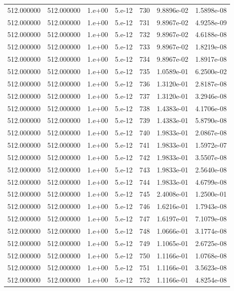 \begin{table}[htbp]
\begin{tabular}{rrrrrrr}
512.000000 & 512.000000 & 1.e+00 & 5.e-12 & 730 & 9.8896e-02 & 1.5898e-08 \\
512.000000 & 512.000000 & 1.e+00 & 5.e-12 & 731 & 9.8967e-02 & 4.9258e-09 \\
512.000000 & 512.000000 & 1.e+00 & 5.e-12 & 732 & 9.8967e-02 & 4.6188e-08 \\
512.000000 & 512.000000 & 1.e+00 & 5.e-12 & 733 & 9.8967e-02 & 1.8219e-08 \\
512.000000 & 512.000000 & 1.e+00 & 5.e-12 & 734 & 9.8967e-02 & 1.8917e-08 \\
512.000000 & 512.000000 & 1.e+00 & 5.e-12 & 735 & 1.0589e-01 & 6.2500e-02 \\
512.000000 & 512.000000 & 1.e+00 & 5.e-12 & 736 & 1.3120e-01 & 2.8187e-08 \\
512.000000 & 512.000000 & 1.e+00 & 5.e-12 & 737 & 1.3120e-01 & 3.2946e-08 \\
512.000000 & 512.000000 & 1.e+00 & 5.e-12 & 738 & 1.4383e-01 & 4.1706e-08 \\
512.000000 & 512.000000 & 1.e+00 & 5.e-12 & 739 & 1.4383e-01 & 5.8790e-08 \\
512.000000 & 512.000000 & 1.e+00 & 5.e-12 & 740 & 1.9833e-01 & 2.0867e-08 \\
512.000000 & 512.000000 & 1.e+00 & 5.e-12 & 741 & 1.9833e-01 & 1.5972e-07 \\
512.000000 & 512.000000 & 1.e+00 & 5.e-12 & 742 & 1.9833e-01 & 3.5507e-08 \\
512.000000 & 512.000000 & 1.e+00 & 5.e-12 & 743 & 1.9833e-01 & 2.5640e-08 \\
512.000000 & 512.000000 & 1.e+00 & 5.e-12 & 744 & 1.9833e-01 & 4.6799e-08 \\
512.000000 & 512.000000 & 1.e+00 & 5.e-12 & 745 & 2.4008e-01 & 1.2500e-01 \\
512.000000 & 512.000000 & 1.e+00 & 5.e-12 & 746 & 1.6216e-01 & 1.7943e-08 \\
512.000000 & 512.000000 & 1.e+00 & 5.e-12 & 747 & 1.6197e-01 & 7.1079e-08 \\
512.000000 & 512.000000 & 1.e+00 & 5.e-12 & 748 & 1.0666e-01 & 3.1774e-08 \\
512.000000 & 512.000000 & 1.e+00 & 5.e-12 & 749 & 1.1065e-01 & 2.6725e-08 \\
512.000000 & 512.000000 & 1.e+00 & 5.e-12 & 750 & 1.1166e-01 & 1.0768e-08 \\
512.000000 & 512.000000 & 1.e+00 & 5.e-12 & 751 & 1.1166e-01 & 3.5623e-08 \\
512.000000 & 512.000000 & 1.e+00 & 5.e-12 & 752 & 1.1166e-01 & 4.8254e-08 \\

\end{tabular}
\end{table}
